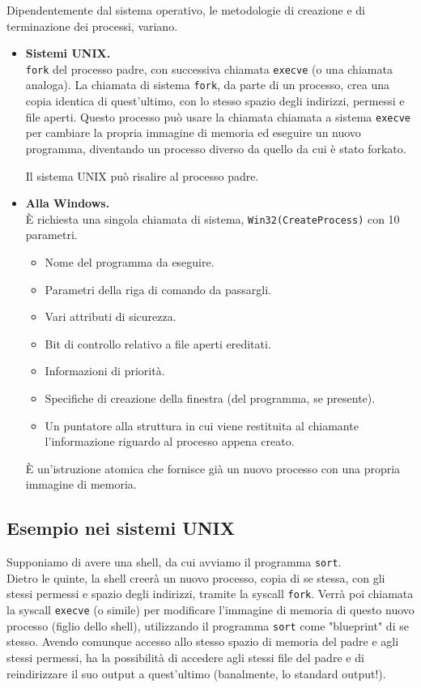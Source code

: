 \documentclass{report}
\begin{document}
Dipendentemente dal sistema operativo, le metodologie di creazione e di terminazione dei processi, variano.
\begin{itemize}
    \item \textbf{Sistemi UNIX.}\\
    \verb|fork| del processo padre, con successiva chiamata \verb|execve| (o una chiamata analoga). La chiamata di sistema \verb|fork|, da parte di un processo, crea una copia identica di quest'ultimo, con lo stesso spazio degli indirizzi, permessi e file aperti. Questo processo può usare la chiamata chiamata a sistema \verb|execve| per cambiare la propria immagine di memoria ed eseguire un nuovo programma, diventando un processo diverso da quello da cui è stato forkato.
    
    Il sistema UNIX può risalire al processo padre.
    \item \textbf{Alla Windows.}\\
    È richiesta una singola chiamata di sistema, \verb|Win32(CreateProcess)| con 10 parametri.
    \begin{itemize}
        \item Nome del programma da eseguire.
        \item Parametri della riga di comando da passargli.
        \item Vari attributi di sicurezza.
        \item Bit di controllo relativo a file aperti ereditati.
        \item Informazioni di priorità.
        \item Specifiche di creazione della finestra (del programma, se presente).
        \item Un puntatore alla struttura in cui viene restituita al chiamante l'informazione riguardo al processo appena creato.
    \end{itemize}
    È un'istruzione atomica che fornisce già un nuovo processo con una propria immagine di memoria.
\end{itemize}

\subsection{Esempio nei sistemi UNIX}
Supponiamo di avere una shell, da cui avviamo il programma \verb|sort|.\\
Dietro le quinte, la shell creerà un nuovo processo, copia di se stessa, con gli stessi permessi e spazio degli indirizzi, tramite la syscall \verb|fork|. Verrà poi chiamata la syscall \verb|execve| (o simile) per modificare l'immagine di memoria di questo nuovo processo (figlio dello shell), utilizzando il programma \verb|sort| come "blueprint" di se stesso. Avendo comunque accesso allo stesso spazio di memoria del padre e agli stessi permessi, ha la possibilità di accedere agli stessi file del padre e di reindirizzare il suo output a quest'ultimo (banalmente, lo standard output!).
\end{document}
